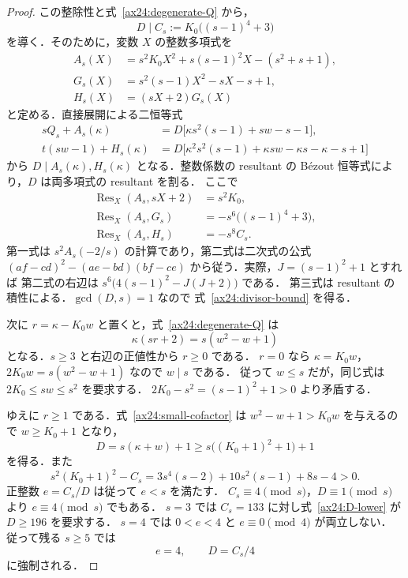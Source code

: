 \begin{proof}
この整除性と式~\eqref{ax24:degenerate-Q} から，
\begin{equation}\label{ax24:divisor-bound}
 D\mid C_s:=K_0\bigl((s-1)^4+3\bigr)
\end{equation}
を導く．そのために，変数 $X$ の整数多項式を
\begin{equation}\label{ax24:resultant-polynomials}
 \begin{aligned}
 A_s(X)&=s^2K_0X^2+s(s-1)^2X-(s^2+s+1),\\
 G_s(X)&=s^2(s-1)X^2-sX-s+1,\\
 H_s(X)&=(sX+2)G_s(X)
 \end{aligned}
\end{equation}
と定める．直接展開による二恒等式
\begin{align*}
 sQ_s+A_s(\kappa)
 &=D\bigl[\kappa s^2(s-1)+sw-s-1\bigr],\\
 t(sw-1)+H_s(\kappa)
 &=D\bigl[\kappa^2s^2(s-1)+\kappa sw-\kappa s-\kappa-s+1\bigr]
\end{align*}
から $D\mid A_s(\kappa),H_s(\kappa)$ となる．整数係数の resultant の
B\'ezout 恒等式により，$D$ は両多項式の resultant を割る．
ここで
\begin{equation}\label{ax24:resultants}
 \begin{aligned}
 \operatorname{Res}_X(A_s,sX+2)&=s^2K_0,\\
 \operatorname{Res}_X(A_s,G_s)&=-s^6\bigl((s-1)^4+3\bigr),\\
 \operatorname{Res}_X(A_s,H_s)&=-s^8C_s.
 \end{aligned}
\end{equation}
第一式は $s^2A_s(-2/s)$ の計算であり，第二式は二次式の公式
$(af-cd)^2-(ae-bd)(bf-ce)$ から従う．実際，$J=(s-1)^2+1$ とすれば
第二式の右辺は $s^6\bigl(4(s-1)^2-J(J+2)\bigr)$ である．
第三式は resultant の積性による．$\gcd(D,s)=1$ なので
式~\eqref{ax24:divisor-bound} を得る．

次に $r=\kappa-K_0w$ と置くと，式~\eqref{ax24:degenerate-Q} は
\begin{equation}\label{ax24:small-cofactor}
 \kappa(sr+2)=s(w^2-w+1)
\end{equation}
となる．$s\ge3$ と右辺の正値性から $r\ge0$ である．
$r=0$ なら $\kappa=K_0w$，$2K_0w=s(w^2-w+1)$ なので $w\mid s$ である．
従って $w\le s$ だが，同じ式は $2K_0\le sw\le s^2$ を要求する．
$2K_0-s^2=(s-1)^2+1>0$ より矛盾する．

ゆえに $r\ge1$ である．式~\eqref{ax24:small-cofactor} は
$w^2-w+1>K_0w$ を与えるので $w\ge K_0+1$ となり，
\begin{equation}\label{ax24:D-lower}
 D=s(\kappa+w)+1\ge s\bigl((K_0+1)^2+1\bigr)+1
\end{equation}
を得る．また
\[
 s^2(K_0+1)^2-C_s
 =3s^4(s-2)+10s^2(s-1)+8s-4>0.
\]
正整数 $e=C_s/D$ は従って $e<s$ を満たす．
$C_s\equiv4\pmod s$，$D\equiv1\pmod s$ より $e\equiv4\pmod s$ でもある．
$s=3$ では $C_s=133$ に対し式~\eqref{ax24:D-lower} が $D\ge196$ を要求する．
$s=4$ では $0<e<4$ と $e\equiv0\pmod4$ が両立しない．
従って残る $s\ge5$ では
\begin{equation}\label{ax24:cofactor-four}
 e=4,\qquad D=C_s/4
\end{equation}
に強制される．


\end{proof}
